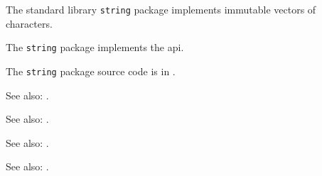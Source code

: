 
The standard library {\tt string} package implements immutable vectors of characters.

The {\tt string} package implements the  api.

The {\tt string} package source code is in .

See also:  .

See also:  .

See also:  .

See also:  .
